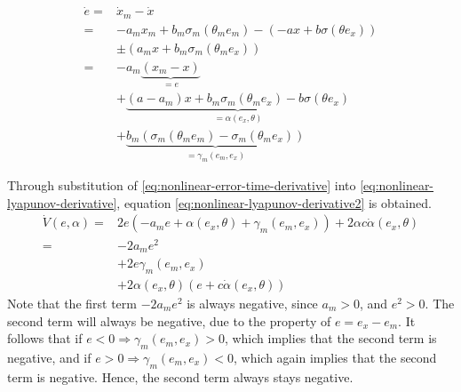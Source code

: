 \begin{equation}
    \begin{aligned}
    \dot e 
= & \dot x_m - \dot x \\ 
= & -a_mx_m + b_m\sigma_m(\theta_me_m) - (-ax + b\sigma(\theta e_x)) \\
    & \pm (a_mx + b_m \sigma_m(\theta_m e_x)) \\
    = & -a_m \underbrace{(x_m-x)}_{=e} \\ 
    & + \underbrace{(a-a_m)x+b_m\sigma_m(\theta_me_x) - b\sigma(\theta e_x)}_{=\alpha(e_x, \theta)} \\ 
    & + \underbrace{b_m(\sigma_m(\theta_m e_m)-\sigma_m(\theta_m e_x))}_{=\gamma_m(e_m,e_x)}
    \end{aligned}
    \label{eq:nonlinear-error-time-derivative}
\end{equation}

Through substitution of \eqref{eq:nonlinear-error-time-derivative} into \eqref{eq:nonlinear-lyapunov-derivative}, equation \eqref{eq:nonlinear-lyapunov-derivative2} is obtained.
\begin{equation}
    \begin{aligned}
    \dot V(e, \alpha) 
    = & 2e(-a_me + \alpha(e_x, \theta) + \gamma_m(e_m, e_x)) + 2\alpha c \dot \alpha(e_x, \theta)\\
    = & -2a_me^2 \\ 
    & + 2e\gamma_m(e_m, e_x) 
    \\ 
    & + 2\alpha(e_x, \theta)(e + c \dot \alpha(e_x, \theta))
    \end{aligned}
    \label{eq:nonlinear-lyapunov-derivative2}
\end{equation}
Note that the first term $-2a_me^2$ is always negative, since $a_m>0$, and $e^2 > 0$. The second term will always be negative, due to the property of $e=e_x-e_m$. It follows that if $e<0 \Rightarrow \gamma_m(e_m, e_x)>0$, which implies that the second term is negative, and if $e>0 \Rightarrow \gamma_m(e_m, e_x)<0$, which again implies that the second term is negative. Hence, the second term always stays negative.

